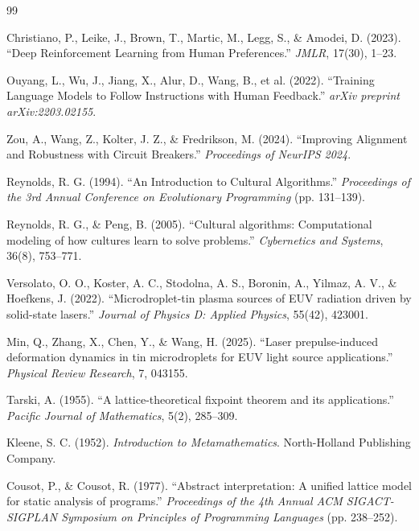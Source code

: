 \documentclass[twocolumn]{article}
\begin{document}
\begin{thebibliography}{99}

Christiano, P., Leike, J., Brown, T., Martic, M., Legg, S., \& Amodei, D. (2023).
``Deep Reinforcement Learning from Human Preferences.''
\textit{JMLR}, 17(30), 1–23.

Ouyang, L., Wu, J., Jiang, X., Alur, D., Wang, B., et al. (2022).
``Training Language Models to Follow Instructions with Human Feedback.''
\textit{arXiv preprint arXiv:2203.02155}.

Zou, A., Wang, Z., Kolter, J. Z., \& Fredrikson, M. (2024).
``Improving Alignment and Robustness with Circuit Breakers.''
\textit{Proceedings of NeurIPS 2024}.

Reynolds, R. G. (1994).
``An Introduction to Cultural Algorithms.''
\textit{Proceedings of the 3rd Annual Conference on Evolutionary Programming} (pp. 131--139).

Reynolds, R. G., \& Peng, B. (2005).
``Cultural algorithms: Computational modeling of how cultures learn to solve problems.''
\textit{Cybernetics and Systems}, 36(8), 753--771.

Versolato, O. O., Koster, A. C., Stodolna, A. S., Boronin, A., Yilmaz, A. V., \& Hoefkens, J. (2022).
``Microdroplet-tin plasma sources of EUV radiation driven by solid-state lasers.''
\textit{Journal of Physics D: Applied Physics}, 55(42), 423001.

Min, Q., Zhang, X., Chen, Y., \& Wang, H. (2025).
``Laser prepulse-induced deformation dynamics in tin microdroplets for EUV light source applications.''
\textit{Physical Review Research}, 7, 043155.

Tarski, A. (1955).
``A lattice-theoretical fixpoint theorem and its applications.''
\textit{Pacific Journal of Mathematics}, 5(2), 285--309.

Kleene, S. C. (1952).
\textit{Introduction to Metamathematics}.
North-Holland Publishing Company.

Cousot, P., \& Cousot, R. (1977).
``Abstract interpretation: A unified lattice model for static analysis of programs.''
\textit{Proceedings of the 4th Annual ACM SIGACT-SIGPLAN Symposium on Principles of Programming Languages} (pp. 238--252).

\end{thebibliography}
\end{document}
